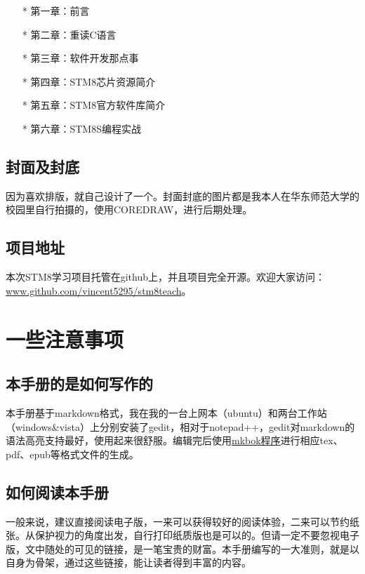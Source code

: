 \documentclass[a4paper]{book}
\begin{document}
\begin{itemize}\setlength{\itemsep}{1pt}\setlength{\parskip}{0pt}\setlength{\parsep}{0pt}
\item[*]
  第一章：前言
\item[*]
  第二章：重读C语言
\item[*]
  第三章：软件开发那点事
\item[*]
  第四章：STM8芯片资源简介
\item[*]
  第五章：STM8官方软件库简介
\item[*]
  第六章：STM8S编程实战
\end{itemize}
\subsection*{封面及封底}

因为喜欢排版，就自己设计了一个。封面封底的图片都是我本人在华东师范大学的校园里自行拍摄的，使用COREDRAW，进行后期处理。

\subsection*{项目地址}

本次STM8学习项目托管在github上，并且项目完全开源。欢迎大家访问：\href{www.github.com/vincent5295/stm8teach}{www.github.com/vincent5295/stm8teach}。

\section*{一些注意事项}

\subsection*{本手册的是如何写作的}

本手册基于markdown格式，我在我的一台上网本（ubuntu）和两台工作站（windows\&vista）上分别安装了gedit，相对于notepad++，gedit对markdown的语法高亮支持最好，使用起来很舒服。编辑完后使用\href{www.github.com/larrycai/mkbok}{mkbok程序}进行相应tex、pdf、epub等格式文件的生成。

\subsection*{如何阅读本手册}

一般来说，建议直接阅读电子版，一来可以获得较好的阅读体验，二来可以节约纸张。从保护视力的角度出发，自行打印纸质版也是可以的。但请一定不要忽视电子版，文中随处的可见的链接，是一笔宝贵的财富。本手册编写的一大准则，就是以自身为骨架，通过这些链接，能让读者得到丰富的内容。
\end{document}
